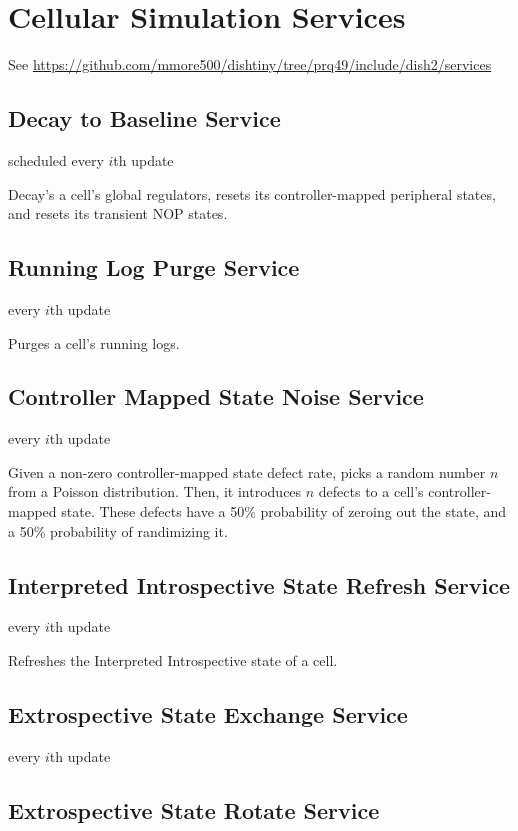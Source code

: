 \section{Cellular Simulation Services}

See \url{https://github.com/mmore500/dishtiny/tree/prq49/include/dish2/services}

\subsection{Decay to Baseline Service}

scheduled every $i$th update

Decay's a cell's global regulators, resets its controller-mapped peripheral states, and resets its transient NOP states.

\subsection{Running Log Purge Service}

every $i$th update

Purges a cell's running logs.

\subsection{Controller Mapped State Noise Service}

every $i$th update

Given a non-zero controller-mapped state defect rate, picks a random number $n$ from a Poisson distribution.
Then, it introduces $n$ defects to a cell's controller-mapped state.
These defects have a 50\% probability of zeroing out the state, and a 50\% probability of randimizing it.

\subsection{Interpreted Introspective State Refresh Service}

every $i$th update

Refreshes the Interpreted Introspective state of a cell.

\subsection{Extrospective State Exchange Service}

every $i$th update


\subsection{Extrospective State Rotate Service}

